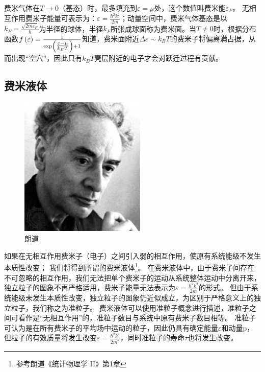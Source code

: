 费米气体在$T \to 0$（基态）时，最多填充到$\varepsilon  = \mu $处，这个数值叫费米能$\varepsilon _F $。
无相互作用费米子能量可表示为：$\varepsilon  = \frac{{\hbar ^2 k^2 }}{{2m}}$；动量空间中，费米气体基态是以$k_F  = \frac{{\sqrt {2m\varepsilon _F } }}{\hbar }$为半径的球体，半径$k_F$所张成球面称为费米面。当$T \ne 0$时，根据分布函数$f\left( \varepsilon  \right) = \frac{1}{{\exp \left( {{\textstyle{{\varepsilon  - \mu } \over {k_B T}}}} \right) + 1}}$知道，费米面附近$\Delta \varepsilon  \sim k_B T$的费米子将偏离满占据，从而出现``空穴''，因此只有$k_B T$壳层附近的电子才会对跃迁过程有贡献。


\subsection{费米液体}


\begin{figure}[h]
\begin{center}
\includegraphics[clip,width=6cm]{IdenticalParticles/landau.ps}
\caption{朗道}
\end{center}
\end{figure}


如果在无相互作用费米子（电子）之间引入弱的相互作用，使原有系统能级不发生本质性改变；
我们将得到所谓的费米液体\footnote{参考朗道《统计物理学 II》第1章}。
在费米液体中，由于费米子间存在不可忽略的相互作用，我们无法把单个费米子的运动从系统整体运动中分离开来，
独立粒子的图象不再严格适用，费米子能量无法表示为$\varepsilon  = \frac{{\hbar ^2 k^2 }}{{2m}}$的形式。
但由于系统能级未发生本质性改变，独立粒子的图象仍近似成立，为区别于严格意义上的独立粒子，我们称之为准粒子。
费米液体可以使用准粒子概念进行描述，准粒子之间可看作是``无相互作用''的，准粒子数目与系统中原有费米子数目相等。
准粒子可认为是在所有费米子的平均场中运动的粒子，因此仍具有确定能量$\varepsilon $和动量p，
但粒子的有效质量将发生改变$\varepsilon  = \frac{{\hbar ^2 k^2 }}{{2m^* }}$，同时准粒子的寿命$\tau$也将发生改变。

